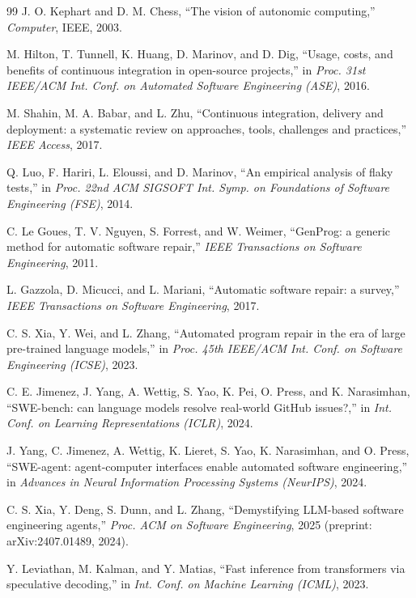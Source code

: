 \begin{thebibliography}{99}
J. O. Kephart and D. M. Chess, ``The vision of autonomic computing,'' \textit{Computer}, IEEE, 2003.

M. Hilton, T. Tunnell, K. Huang, D. Marinov, and D. Dig, ``Usage, costs, and benefits of continuous integration in open-source projects,'' in \textit{Proc. 31st IEEE/ACM Int. Conf. on Automated Software Engineering (ASE)}, 2016.

M. Shahin, M. A. Babar, and L. Zhu, ``Continuous integration, delivery and deployment: a systematic review on approaches, tools, challenges and practices,'' \textit{IEEE Access}, 2017.

Q. Luo, F. Hariri, L. Eloussi, and D. Marinov, ``An empirical analysis of flaky tests,'' in \textit{Proc. 22nd ACM SIGSOFT Int. Symp. on Foundations of Software Engineering (FSE)}, 2014.

C. Le Goues, T. V. Nguyen, S. Forrest, and W. Weimer, ``GenProg: a generic method for automatic software repair,'' \textit{IEEE Transactions on Software Engineering}, 2011.

L. Gazzola, D. Micucci, and L. Mariani, ``Automatic software repair: a survey,'' \textit{IEEE Transactions on Software Engineering}, 2017.

C. S. Xia, Y. Wei, and L. Zhang, ``Automated program repair in the era of large pre-trained language models,'' in \textit{Proc. 45th IEEE/ACM Int. Conf. on Software Engineering (ICSE)}, 2023.

C. E. Jimenez, J. Yang, A. Wettig, S. Yao, K. Pei, O. Press, and K. Narasimhan, ``SWE-bench: can language models resolve real-world GitHub issues?,'' in \textit{Int. Conf. on Learning Representations (ICLR)}, 2024.

J. Yang, C. Jimenez, A. Wettig, K. Lieret, S. Yao, K. Narasimhan, and O. Press, ``SWE-agent: agent-computer interfaces enable automated software engineering,'' in \textit{Advances in Neural Information Processing Systems (NeurIPS)}, 2024.

C. S. Xia, Y. Deng, S. Dunn, and L. Zhang, ``Demystifying LLM-based software engineering agents,'' \textit{Proc. ACM on Software Engineering}, 2025 (preprint: arXiv:2407.01489, 2024).

Y. Leviathan, M. Kalman, and Y. Matias, ``Fast inference from transformers via speculative decoding,'' in \textit{Int. Conf. on Machine Learning (ICML)}, 2023.


\end{thebibliography}
